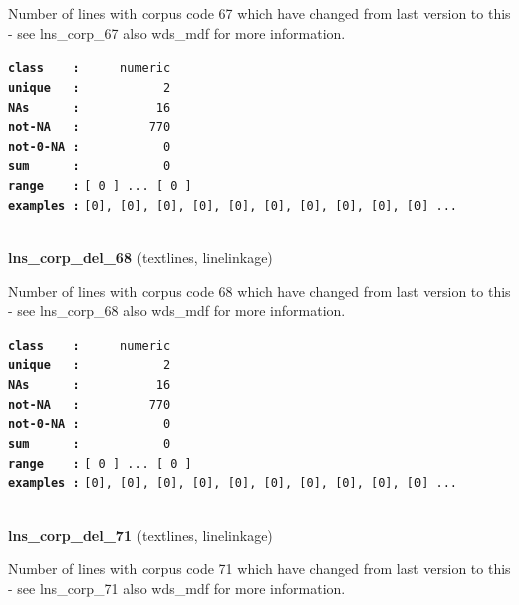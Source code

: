 \documentclass[]{article}
\begin{document}
Number of lines with corpus code 67 which have changed from last version
to this - see lns\_corp\_67 also wds\_mdf for more information.

\textbf{\texttt{class\ \ \ \ :}} \texttt{~~~~~numeric}\\
\textbf{\texttt{unique\ \ \ :}} \texttt{~~~~~~~~~~~2}\\
\textbf{\texttt{NAs\ \ \ \ \ \ :}} \texttt{~~~~~~~~~~16}\\
\textbf{\texttt{not-NA\ \ \ :}} \texttt{~~~~~~~~~770}\\
\textbf{\texttt{not-0-NA\ :}} \texttt{~~~~~~~~~~~0}\\
\textbf{\texttt{sum\ \ \ \ \ \ :}} \texttt{~~~~~~~~~~~0}\\
\textbf{\texttt{range\ \ \ \ :}}
\texttt{{[}\ 0\ {]}\ ...\ {[}\ 0\ {]}}\\
\textbf{\texttt{examples\ :}}
\texttt{{[}0{]},\ {[}0{]},\ {[}0{]},\ {[}0{]},\ {[}0{]},\ {[}0{]},\ {[}0{]},\ {[}0{]},\ {[}0{]},\ {[}0{]}\ ...}\\

~

\textbf{lns\_corp\_del\_68} (textlines, linelinkage)

Number of lines with corpus code 68 which have changed from last version
to this - see lns\_corp\_68 also wds\_mdf for more information.

\textbf{\texttt{class\ \ \ \ :}} \texttt{~~~~~numeric}\\
\textbf{\texttt{unique\ \ \ :}} \texttt{~~~~~~~~~~~2}\\
\textbf{\texttt{NAs\ \ \ \ \ \ :}} \texttt{~~~~~~~~~~16}\\
\textbf{\texttt{not-NA\ \ \ :}} \texttt{~~~~~~~~~770}\\
\textbf{\texttt{not-0-NA\ :}} \texttt{~~~~~~~~~~~0}\\
\textbf{\texttt{sum\ \ \ \ \ \ :}} \texttt{~~~~~~~~~~~0}\\
\textbf{\texttt{range\ \ \ \ :}}
\texttt{{[}\ 0\ {]}\ ...\ {[}\ 0\ {]}}\\
\textbf{\texttt{examples\ :}}
\texttt{{[}0{]},\ {[}0{]},\ {[}0{]},\ {[}0{]},\ {[}0{]},\ {[}0{]},\ {[}0{]},\ {[}0{]},\ {[}0{]},\ {[}0{]}\ ...}\\

~

\textbf{lns\_corp\_del\_71} (textlines, linelinkage)

Number of lines with corpus code 71 which have changed from last version
to this - see lns\_corp\_71 also wds\_mdf for more information.
\end{document}
